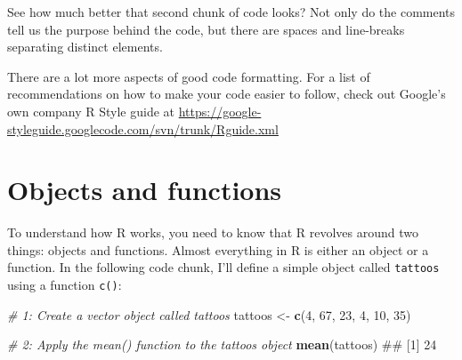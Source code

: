 \documentclass[]{book}
\newenvironment{Shaded}{\begin{snugshade}}{\end{snugshade}}
\newcommand{\KeywordTok}[1]{\textcolor[rgb]{0.13,0.29,0.53}{\textbf{{#1}}}}
\newcommand{\DataTypeTok}[1]{\textcolor[rgb]{0.13,0.29,0.53}{{#1}}}
\newcommand{\DecValTok}[1]{\textcolor[rgb]{0.00,0.00,0.81}{{#1}}}
\newcommand{\FloatTok}[1]{\textcolor[rgb]{0.00,0.00,0.81}{{#1}}}
\newcommand{\StringTok}[1]{\textcolor[rgb]{0.31,0.60,0.02}{{#1}}}
\newcommand{\CommentTok}[1]{\textcolor[rgb]{0.56,0.35,0.01}{\textit{{#1}}}}
\newcommand{\NormalTok}[1]{{#1}}
\theoremstyle{definition}
\theoremstyle{definition}
\theoremstyle{remark}
\begin{document}
\begin{Shaded}
\end{Shaded}

See how much better that second chunk of code looks? Not only do the
comments tell us the purpose behind the code, but there are spaces and
line-breaks separating distinct elements.

There are a lot more aspects of good code formatting. For a list of
recommendations on how to make your code easier to follow, check out
Google's own company R Style guide at
\url{https://google-styleguide.googlecode.com/svn/trunk/Rguide.xml}

\section{Objects and functions}\label{objects-and-functions}

To understand how R works, you need to know that R revolves around two
things: objects and functions. Almost everything in R is either an
object or a function. In the following code chunk, I'll define a simple
object called \texttt{tattoos} using a function \texttt{c()}:

\begin{Shaded}
\begin{Highlighting}[]
\CommentTok{# 1: Create a vector object called tattoos}
\NormalTok{tattoos <-}\StringTok{ }\KeywordTok{c}\NormalTok{(}\DecValTok{4}\NormalTok{, }\DecValTok{67}\NormalTok{, }\DecValTok{23}\NormalTok{, }\DecValTok{4}\NormalTok{, }\DecValTok{10}\NormalTok{, }\DecValTok{35}\NormalTok{)}

\CommentTok{# 2: Apply the mean() function to the tattoos object}
\KeywordTok{mean}\NormalTok{(tattoos)}
\NormalTok{## [1] 24}
\end{Highlighting}
\end{Shaded}
\end{document}
